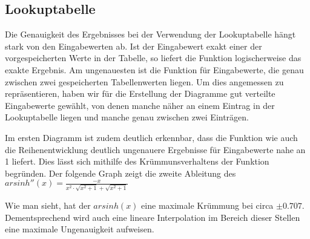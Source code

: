 \documentclass[course=erap] {aspdoc}
\begin{document}
    \subsection{Lookuptabelle}
    Die Genauigkeit des Ergebnisses bei der Verwendung der Lookuptabelle hängt stark von den Eingabewerten ab. Ist der Eingabewert exakt einer der vorgespeicherten Werte in der Tabelle, so liefert die Funktion logischerweise das exakte Ergebnis. Am ungenauesten ist die Funktion für Eingabewerte, die genau zwischen zwei gespeicherten Tabellenwerten liegen. Um dies angemessen zu repräsentieren, haben wir für die Erstellung der Diagramme gut verteilte Eingabewerte gewählt, von denen manche näher an einem Eintrag in der Lookuptabelle liegen und manche genau zwischen zwei Einträgen.  
    
    Im ersten Diagramm ist zudem deutlich erkennbar, dass die Funktion wie auch die Reihenentwicklung deutlich ungenauere Ergebnisse für Eingabewerte nahe an 1 liefert. Dies lässt sich mithilfe des Krümmunsverhaltens der Funktion begründen. Der folgende Graph zeigt die zweite Ableitung des $arsinh''(x) = \frac{-x}{x^2\cdot \sqrt{x^2+1}+\sqrt{x^2+1}}$

    

    Wie man sieht, hat der $arsinh(x)$ eine maximale Krümmung bei circa $\pm 0.707$. Dementsprechend wird auch eine lineare Interpolation im Bereich dieser Stellen eine maximale Ungenauigkeit aufweisen.
    
\end{document}
